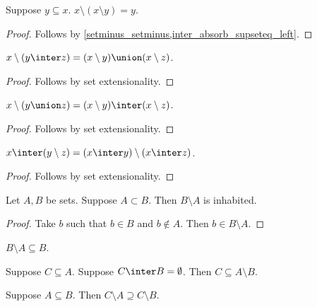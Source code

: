 \begin{proposition}\label{double_relative_complement}
    Suppose $y\subseteq x$.
    $x\setminus (x\setminus y) = y$.
\end{proposition}
\begin{proof}
    Follows by \cref{setminus_setminus,inter_absorb_supseteq_left}.
\end{proof}

\begin{proposition}\label{setminus_inter}
    $x\setminus (y\inter z) = (x\setminus y)\union (x\setminus z)$.
\end{proposition}
\begin{proof}
    Follows by set extensionality.
\end{proof}

\begin{proposition}\label{setminus_union}
    $x\setminus (y\union z) = (x\setminus y)\inter (x\setminus z)$.
\end{proposition}
\begin{proof}
    Follows by set extensionality.
\end{proof}

\begin{proposition}\label{inter_setminus}
    $x\inter (y\setminus z) = (x\inter y)\setminus (x\inter z)$.
\end{proposition}
\begin{proof}
    Follows by set extensionality.
\end{proof}

\begin{proposition}%
\label{difference_with_proper_subset_is_inhabited}
    Let $A, B$ be sets.
    Suppose $A\subset B$.
    Then $B\setminus A$ is inhabited.
\end{proposition}
\begin{proof}
    Take $b$ such that $b\in B$ and $b\notin A$.
    Then $b\in B\setminus A$.
\end{proof}

\begin{proposition}\label{setminus_subseteq}
    $B\setminus A\subseteq B$.
\end{proposition}

\begin{proposition}\label{subseteq_setminus}
    Suppose $C\subseteq A$.
    Suppose $C\inter B = \emptyset$.
    Then $C\subseteq A\setminus B$.
\end{proposition}


\begin{proposition}\label{subseteq_implies_setminus_supseteq}
    Suppose $A\subseteq B$.
    Then $C\setminus A\supseteq C\setminus B$.
\end{proposition}

